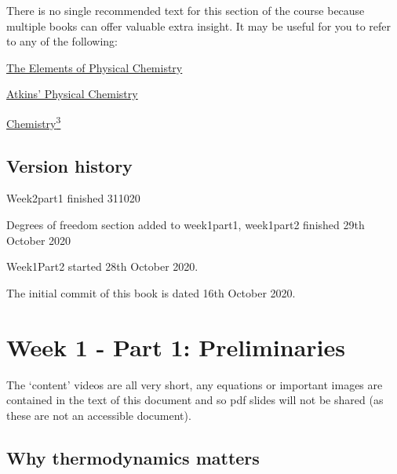 \documentclass[
]{book}
\begin{document}
There is no single recommended text for this section of the course because multiple books can offer valuable extra insight. It may be useful for you to refer to any of the following:

\href{https://bath-ac-primo.hosted.exlibrisgroup.com/primo-explore/search?query=any,contains,Elements\%20of\%20physical\%20chemistry\&tab=local\&sortby=date\&vid=44BAT_VU1\&facet=frbrgroupid,include,978286819\&offset=0\&pcAvailability=false}{The Elements of Physical Chemistry}

\href{https://bath-ac-primo.hosted.exlibrisgroup.com/primo-explore/search?query=any,contains,physical\%20chemistry\%20de\%20paula\&tab=local\&search_scope=CSCOP_44BAT_DEEP\&sortby=date\&vid=44BAT_VU1\&facet=frbrgroupid,include,978327499\&offset=0\&pcAvailability=false}{Atkins' Physical Chemistry}

\href{https://bath-ac-primo.hosted.exlibrisgroup.com/primo-explore/search?query=any,contains,chemistry3\&tab=local\&search_scope=CSCOP_44BAT_DEEP\&sortby=date\&vid=44BAT_VU1\&facet=frbrgroupid,include,978293871\&offset=0\&pcAvailability=false}{Chemistry\textsuperscript{3}}

\hypertarget{version-history}{%
\section*{Version history}\label{version-history}}

Week2part1 finished 311020

Degrees of freedom section added to week1part1, week1part2 finished 29th October 2020

Week1Part2 started 28th October 2020.

The initial commit of this book is dated 16th October 2020.

\hypertarget{ch:Part1}{%
\chapter{Week 1 - Part 1: Preliminaries}\label{ch:Part1}}

The `content' videos are all very short, any equations or important images are contained in the text of this document and so pdf slides will not be shared (as these are not an accessible document).

\hypertarget{sec:whyjustwhy}{%
\section{Why thermodynamics matters}\label{sec:whyjustwhy}}
\end{document}
